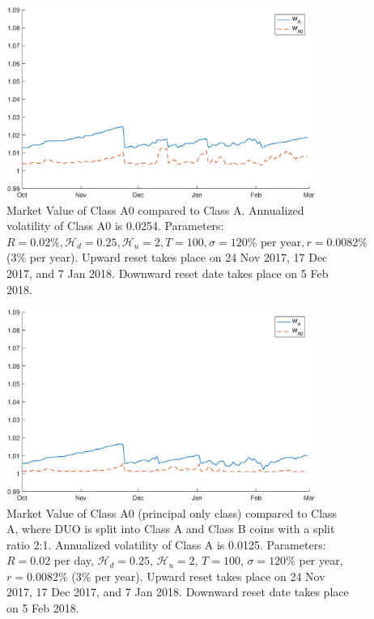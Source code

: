 \documentclass[draft, noinfoline]{ectaart}
\numberwithin{equation}{section}
\theoremstyle{plain}
\begin{document}
\begin{appendices}
\begin{figure}[!htb]
\centering
\includegraphics[width=0.9\textwidth]{WA0_alpha1.eps}
\caption{Market Value of Class A0 compared to Class A. Annualized volatility of Class A0 is 0.0254. Parameters: $R=0.02\%,\mathcal{H}_{d}=0.25,\mathcal{H}_{u} =2,T=100,\sigma= 120 \% \text{ per year}, r=0.0082\%$ (3\% per year). Upward reset takes place on 24 Nov 2017, 17 Dec 2017, and 7 Jan 2018. Downward reset date takes place on 5 Feb 2018.}
\label{fig:valA0a1}
\end{figure}


\begin{figure}[!htb]
\centering
\includegraphics[width=0.9\textwidth]{WA0_alpha2.eps}
\caption{Market Value of Class A0 (principal only class) compared to Class A, where DUO is split into Class A and Class B coins with a split ratio 2:1. Annualized volatility of Class A is 0.0125. Parameters: $R=0.02$ per day, $\mathcal{H}_{d}=0.25$, $\mathcal{H}_{u} =2$, $T=100$, $\sigma= 120\%$ per year, $r=0.0082\%$ (3\% per year). Upward reset takes place on 24 Nov 2017, 17 Dec 2017, and 7 Jan 2018. Downward reset date takes place on 5 Feb 2018.}
\label{fig:valA0a2}
\end{figure}







\end{appendices}
\end{document}
